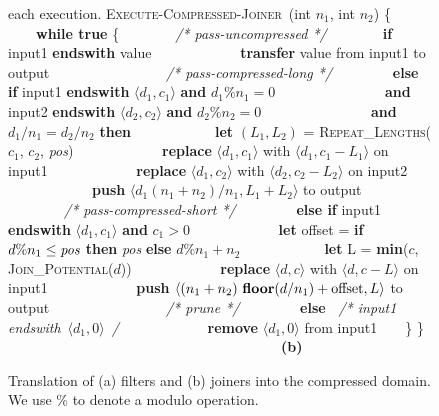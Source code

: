 \begin{figure*}[t]
\begin{minipage}{0.52\textwidth}
{  each execution.}\mynewline
\textsc{Execute-Compressed-Joiner}~(int $n_1$, int $n_2$) \{\mynewline
\mbox{~~~~}{\bf while true} \{\mynewline \mbox{~~~~}\mbox{~~~~}{\it /*
  pass-uncompressed */}\mynewline \mbox{~~~~}\mbox{~~~~}{\bf if}
input1 {\bf endswith} value\mynewline
\mbox{~~~~}\mbox{~~~~}\mbox{~~~~}{\bf transfer} value from input1 to
output\mynewline \mbox{~~~~}\mbox{~~~~}\mynewline
\mbox{~~~~}\mbox{~~~~}{\it /* pass-compressed-long */}\mynewline
\mbox{~~~~}\mbox{~~~~}{\bf else if} input1 {\bf endswith} $\langle
d_1,c_1 \rangle$ {\bf and} $d_1\%n_1 = 0$\mynewline
\mbox{~~~~}\mbox{~~~~}\mbox{~~~~~~~}{\bf and} input2 {\bf endswith}
$\langle d_2,c_2 \rangle$ {\bf and} $d_2\%n_2 = 0$\mynewline
\mbox{~~~~}\mbox{~~~~}\mbox{~~~~~~~}{\bf and} $d_1/n_1 = d_2/n_2$ {\bf
  then}\mynewline \mbox{~~~~}\mbox{~~~~}\mbox{~~~~}{\bf let} $(L_1,
L_2)$ = \textsc{Repeat\_Lengths}($c_1$, $c_2$, {\it pos})\mynewline
\mbox{~~~~}\mbox{~~~~}\mbox{~~~~}{\bf replace} $\langle d_1, c_1
\rangle$ with $\langle d_1, c_1-L_1\rangle$ on input1\mynewline
\mbox{~~~~}\mbox{~~~~}\mbox{~~~~}{\bf replace} $\langle d_1, c_2
\rangle$ with $\langle d_2, c_2-L_2\rangle$ on input2\mynewline
\mbox{~~~~}\mbox{~~~~}\mbox{~~~~}{\bf push} $\langle d_1(n_1+n_2)/n_1,
L_1+L_2 \rangle$ to output\mynewline \mbox{~~~~}\mbox{~~~~}\mynewline
\mbox{~~~~}\mbox{~~~~}{\it /* pass-compressed-short */}\mynewline
\mbox{~~~~}\mbox{~~~~}{\bf else if} input1 {\bf endswith} $\langle
d_1,c_1 \rangle$ {\bf and} $c_1>0$\mynewline
\mbox{~~~~}\mbox{~~~~}\mbox{~~~~}{\bf let} offset = {\bf if} $d\%n_1
\leq \mbox{\it pos}$ {\bf then} {\it pos} {\bf else} $d\%n_1 +
n_2$\mynewline \mbox{~~~~}\mbox{~~~~}\mbox{~~~~}{\bf let} L = {\bf
  min}($c$, \textsc{Join\_Potential}($d$))\mynewline
\mbox{~~~~}\mbox{~~~~}\mbox{~~~~}{\bf replace} $\langle d, c\rangle$
with $\langle d, c - L\rangle$ on input1\mynewline
\mbox{~~~~}\mbox{~~~~}\mbox{~~~~}{\bf push} $\langle
(n_1+n_2)~\mbox{\bf floor}(d/n_1) + \mbox{offset}, L \rangle$ to
output\mynewline \mbox{~~~~}\mbox{~~~~}\mynewline
\mbox{~~~~}\mbox{~~~~}{\it /* prune */}\mynewline
\mbox{~~~~}\mbox{~~~~}{\bf else~} {\it /* input1 endswith}~$\langle
d_1, 0 \rangle$~{\it */}\mynewline
\mbox{~~~~}\mbox{~~~~}\mbox{~~~~}{\bf remove} $\langle d_1,0 \rangle$
from input1\mynewline \mbox{~~~~}\}\mynewline
\}\mynewline
\mbox{~}~~~~~~~~~~~~~~~~~~~~~~~~~~~~~~~~~~~~~~{\bf (b)}\mynewline
\end{minipage}
\caption{Translation of (a) filters and (b) joiners into the
  compressed domain.  We use $\%$ to denote a modulo operation.
\protect\label{fig:translate}}
\vspace{6pt}
\end{figure*}


